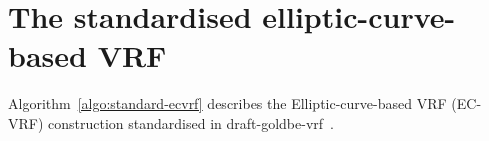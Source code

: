 
\section{The standardised elliptic-curve-based VRF}
\label{sec:ec-vrf}

Algorithm~\ref{algo:standard-ecvrf} describes the Elliptic-curve-based VRF (EC-VRF) construction standardised in draft-goldbe-vrf~\cite{goldberg2017draft}.

